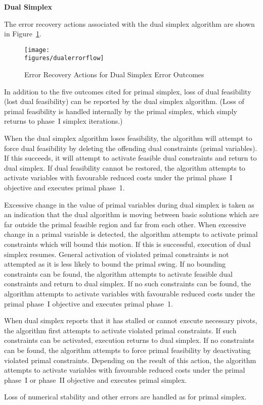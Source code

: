 \noindent
\textbf{Dual Simplex}

The error recovery actions associated with the dual simplex algorithm are
shown in Figure~\ref{fig:DynErrRecDual}.
\begin{figure}
\centering
\texttt{[image: \\figures/dualerrorflow]}
\caption{Error Recovery Actions for Dual Simplex Error Outcomes}
\label{fig:DynErrRecDual}
\end{figure}
In addition to the five outcomes cited for primal simplex, loss of dual
feasibility (lost dual feasibility) can be reported by the dual simplex
algorithm.
(Loss of primal feasibility is handled internally by the primal simplex, which
simply returns to phase~I simplex iterations.)

When the dual simplex algorithm loses feasibility, the algorithm will attempt
to force dual feasibility by deleting the offending dual constraints (primal
variables).
If this succeeds, it will attempt to activate feasible dual constraints and
return to dual simplex.
If dual feasibility cannot be restored, the algorithm attempts to activate
variables with favourable reduced costs under the primal phase~I objective and
executes primal phase~1\@.

Excessive change in the value of primal variables during dual simplex is taken
as an indication that the dual algorithm is moving between basic solutions
which are far outside the primal feasible region and far from each other.
When excessive change in a primal variable is detected, the algorithm
attempts to activate primal constraints which will bound this motion.
If this is successful, execution of dual simplex resumes.
General activation of violated primal constraints is not attempted as it is
less likely to bound the primal swing.
If no bounding constraints can be found, the algorithm attempts to activate
feasible dual constraints and return to dual simplex.
If no such constraints can be found, 
the algorithm attempts to activate
variables with favourable reduced costs under the primal phase~I objective and
executes primal phase~1\@.

When dual simplex reports that it has stalled or cannot execute necessary
pivots, the algorithm first attempts to activate violated primal constraints.
If such constraints can be activated, execution returns to dual simplex.
If no constraints can be found, the algorithm attempts to force primal
feasibility by deactivating violated primal constraints.
Depending on the result of this action, the algorithm attempts to activate
variables with favourable reduced costs under the primal phase~I or phase~II
objective and executes primal simplex.

Loss of numerical stability and other errors are handled as for primal
simplex.
